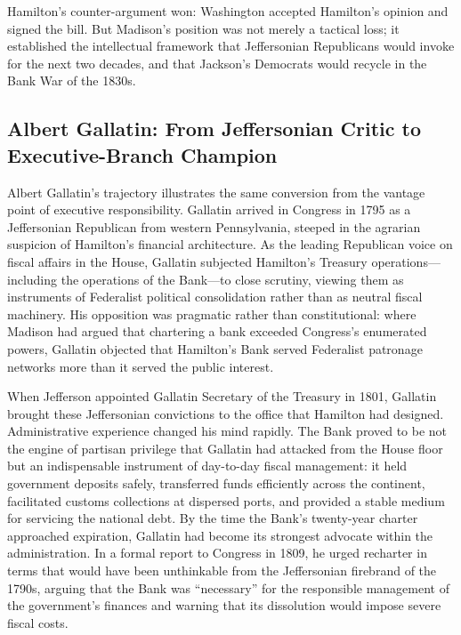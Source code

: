 \documentclass[12pt]{article}
\begin{document}
Hamilton's counter-argument won: Washington accepted Hamilton's opinion
and signed the bill.  But Madison's position was not merely a tactical
loss; it established the intellectual framework that Jeffersonian
Republicans would invoke for the next two decades, and that Jackson's
Democrats would recycle in the Bank War of the 1830s.

\subsection{Albert Gallatin: From Jeffersonian Critic to
             Executive-Branch Champion}

Albert Gallatin's trajectory illustrates the same conversion from the
vantage point of executive responsibility.  Gallatin arrived in Congress
in 1795 as a Jeffersonian Republican from western Pennsylvania, steeped
in the agrarian suspicion of Hamilton's financial architecture.  As the
leading Republican voice on fiscal affairs in the House, Gallatin
subjected Hamilton's Treasury operations---including the operations of
the Bank---to close scrutiny, viewing them as instruments of
Federalist political consolidation rather than as neutral fiscal
machinery.  His opposition was pragmatic rather than constitutional:
where Madison had argued that chartering a bank exceeded Congress's
enumerated powers, Gallatin objected that Hamilton's Bank served
Federalist patronage networks more than it served the public interest.

When Jefferson appointed Gallatin Secretary of the Treasury in 1801,
Gallatin brought these Jeffersonian convictions to the office that
Hamilton had designed.  Administrative experience changed his mind
rapidly.  The Bank proved to be not the engine of partisan privilege
that Gallatin had attacked from the House floor but an indispensable
instrument of day-to-day fiscal management: it held government deposits
safely, transferred funds efficiently across the continent, facilitated
customs collections at dispersed ports, and provided a stable medium for
servicing the national debt.  By the time the Bank's twenty-year charter
approached expiration, Gallatin had become its strongest advocate within
the administration.  In a formal report to Congress in 1809, he urged
recharter in terms that would have been unthinkable from the
Jeffersonian firebrand of the 1790s, arguing that the Bank was
``necessary'' for the responsible management of the government's
finances and warning that its dissolution would impose severe fiscal
costs.
\end{document}
